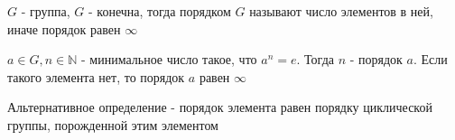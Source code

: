 \begin{Def}
	$G$ - группа, $G$ - конечна, тогда порядком $G$ называют число элементов в ней, иначе порядок равен $\infty$ \\
\end{Def}

\begin{Def}
	$a \in G, n \in \mathbb{N}$ - минимальное число такое, что $a^n = e$. Тогда $n$ - порядок $a$. Если такого элемента нет, то порядок $a$ равен $\infty$
\end{Def}
\begin{Rem}
	Альтернативное определение - порядок элемента равен порядку циклической группы, порожденной этим элементом
\end{Rem}